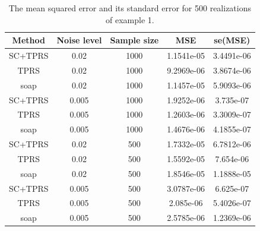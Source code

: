 \documentclass[a4paper,10pt]{amsart}
\begin{document}
\begin{table}[ht]
\begin{tabular}{c c c c c}\\
Method & Noise level & Sample size & MSE & se(MSE)\\
\hline
\hline
SC+TPRS & 0.02 & 1000 & 1.1541e-05 & 3.4491e-06\\
TPRS & 0.02 & 1000 & 9.2969e-06 & 3.8674e-06\\
soap & 0.02 & 1000 & 1.1457e-05 & 5.9093e-06\\
SC+TPRS & 0.005 & 1000 & 1.9252e-06 & 3.735e-07\\
TPRS & 0.005 & 1000 & 1.2603e-06 & 3.3009e-07\\
soap & 0.005 & 1000 & 1.4676e-06 & 4.1855e-07\\
SC+TPRS & 0.02 & 500 & 1.7332e-05 & 6.7812e-06\\
TPRS & 0.02 & 500 & 1.5592e-05 & 7.654e-06\\
soap & 0.02 & 500 & 1.8546e-05 & 1.1888e-05\\
SC+TPRS & 0.005 & 500 & 3.0787e-06 & 6.625e-07\\
TPRS & 0.005 & 500 & 2.085e-06 & 5.4026e-07\\
soap & 0.005 & 500 & 2.5785e-06 & 1.2369e-06\\
\end{tabular}
\caption{The mean squared error and its standard error for 500 realizations of example 1.}
\label{fig9-rect-table}
\end{table}
\end{document}
